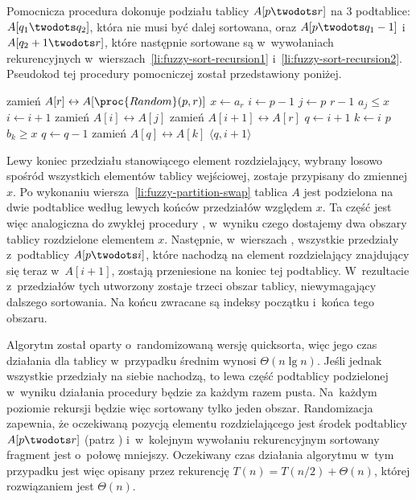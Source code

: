 Pomocnicza procedura  dokonuje podziału tablicy $A[p\twodots r]$ na 3 podtablice: $A[q_1\twodots q_2]$, która nie musi być dalej sortowana, oraz $A[p\twodots q_1-1]$ i~$A[q_2+1\twodots r]$, które następnie sortowane są w~wywołaniach rekurencyjnych w~wierszach~\ref{li:fuzzy-sort-recursion1} i~\ref{li:fuzzy-sort-recursion2}. Pseudokod tej procedury pomocniczej został przedstawiony poniżej.
\begin{codebox}
\li	zamień $A[r]\leftrightarrow A[\proc{Random}(p,r)]$
\li	$x\gets a_r$
\li $i\gets p-1$
\li	\For $j\gets p$ \To $r-1$
\li		\Do
			\If $a_j\le x$
\li				\Then
					$i\gets i+1$
\li					zamień $A[i]\leftrightarrow A[j]$
				\End
		\End
\li	zamień $A[i+1]\leftrightarrow A[r]$ \label{li:fuzzy-partition-swap}
\li	$q\gets i+1$ \label{li:fuzzy-partition-q-init}
\li	\For $k\gets i$ \Downto $p$
\li		\Do
			\If $b_k\ge x$
\li				\Then
					$q\gets q-1$
\li					zamień $A[q]\leftrightarrow A[k]$
				\End
		\End \label{li:fuzzy-partition-for-end}
\li	\Return $\langle q,i+1\rangle$
\end{codebox}
Lewy koniec przedziału stanowiącego element rozdzielający, wybrany losowo spośród wszystkich elementów tablicy wejściowej, zostaje przypisany do zmiennej $x$. Po wykonaniu wiersza~\ref{li:fuzzy-partition-swap} tablica $A$ jest podzielona na dwie podtablice według lewych końców przedziałów względem $x$. Ta część jest więc analogiczna do zwykłej procedury , w~wyniku czego dostajemy dwa obszary tablicy rozdzielone elementem $x$. Następnie, w~wierszach \twodashes{\ref{li:fuzzy-partition-q-init}}{\ref{li:fuzzy-partition-for-end}}, wszystkie przedziały z~podtablicy $A[p\twodots i]$, które nachodzą na element rozdzielający znajdujący się teraz w~$A[i+1]$, zostają przeniesione na koniec tej podtablicy. W~rezultacie z~przedziałów tych utworzony zostaje trzeci obszar tablicy, niewymagający dalszego sortowania. Na końcu zwracane są indeksy początku i~końca tego obszaru.

\subproblem %
Algorytm został oparty o~randomizowaną wersję quicksorta, więc jego czas działania dla tablicy  w~przypadku średnim wynosi $\Theta(n\lg n)$. Jeśli jednak wszystkie przedziały na siebie nachodzą, to lewa część podtablicy podzielonej w~wyniku działania procedury  będzie za każdym razem pusta. Na~każdym poziomie rekursji będzie więc sortowany tylko jeden obszar. Randomizacja zapewnia, że oczekiwaną pozycją elementu rozdzielającego jest środek podtablicy $A[p\twodots r]$ (patrz ) i~w~kolejnym wywołaniu rekurencyjnym sortowany fragment jest o~połowę mniejszy. Oczekiwany czas działania algorytmu w~tym przypadku jest więc opisany przez rekurencję $T(n)=T(n/2)+\Theta(n)$, której rozwiązaniem jest $\Theta(n)$.

\endinput